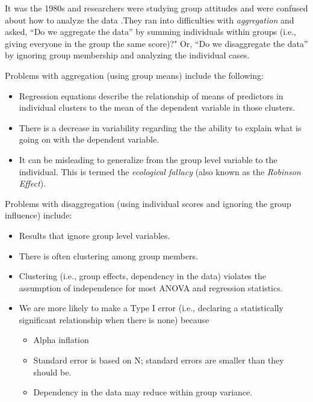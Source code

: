 \documentclass[
  english,
]{book}
\providecommand{\tightlist}{%
  \setlength{\itemsep}{0pt}\setlength{\parskip}{0pt}}
\begin{document}
It was the 1980s and researchers were studying group attitudes and were confused about how to analyze the data \citep{singer_applied_2003}.They ran into difficulties with \emph{aggregation} and asked, ``Do we aggregate the data'' by summing individuals within groups (i.e., giving everyone in the group the same score)?" Or, ``Do we disaggregate the data'' by ignoring group membership and analyzing the individual cases.

Problems with aggregation (using group means) include the following:

\begin{itemize}
\tightlist
\item
  Regression equations describe the relationship of means of predictors in individual clusters to the mean of the dependent variable in those clusters.
\item
  There is a decrease in variability regarding the the ability to explain what is going on with the dependent variable.
\item
  It can be misleading to generalize from the group level variable to the individual. This is termed the \emph{ecological fallacy} (also known as the \emph{Robinson Effect}).
\end{itemize}

Problems with disaggregation (using individual scores and ignoring the group influence) include:

\begin{itemize}
\tightlist
\item
  Results that ignore group level variables.
\item
  There is often clustering among group members.
\item
  Clustering (i.e., group effects, dependency in the data) violates the assumption of independence for most ANOVA and regression statistics.
\item
  We are more likely to make a Type I error (i.e., declaring a statistically significant relationship when there is none) because

  \begin{itemize}
  \tightlist
  \item
    Alpha inflation
  \item
    Standard error is based on N; standard errors are smaller than they should be.
  \item
    Dependency in the data may reduce within group variance.
  \end{itemize}
\end{itemize}
\end{document}
